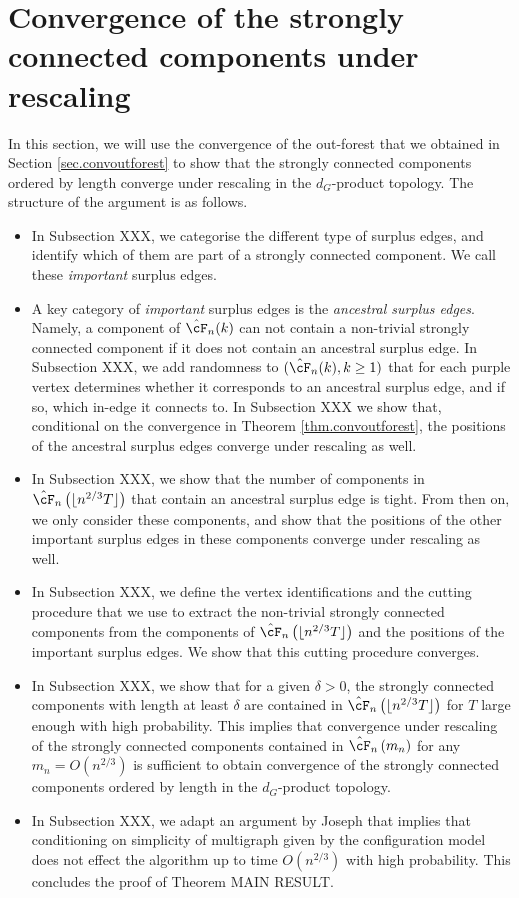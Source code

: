 \section{Convergence of the strongly connected components under rescaling}\label{sec.convSCCs}
In this section, we will use the convergence of the out-forest that we obtained in Section \ref{sec.convoutforest} to show that the strongly connected components ordered by length converge under rescaling in the $d_G$-product topology. The structure of the argument is as follows. 
\begin{itemize}
    \item In Subsection XXX, we categorise the different type of surplus edges, and identify which of them are part of a strongly connected component. We call these \emph{important} surplus edges.
    \item A key category of \emph{important} surplus edges is the \emph{ancestral surplus edges}. Namely, a component of $\hat{\cF}_n(k)$ can not contain a non-trivial strongly connected component if it does not contain an ancestral surplus edge. In Subsection XXX, we add randomness to $(\hat{\cF}_n(k),k\geq 1)$ that for each purple vertex determines whether it corresponds to an ancestral surplus edge, and if so, which in-edge it connects to. In Subsection XXX we show that, conditional on the convergence in Theorem \ref{thm.convoutforest}, the positions of the ancestral surplus edges converge under rescaling as well. 
    \item In Subsection XXX, we show that the number of components in $\hat{\cF}_n\left(\lfloor n^{2/3}T\rfloor \right)$ that contain an ancestral surplus edge is tight. From then on, we only consider these components, and show that the positions of the other important surplus edges in these components converge under rescaling as well. 
    \item In Subsection XXX, we define the vertex identifications and the cutting procedure that we use to extract the non-trivial strongly connected components from the components of $\hat{\cF}_n\left(\lfloor n^{2/3}T\rfloor \right)$ and the positions of the important surplus edges. We show that this cutting procedure converges.
    \item In Subsection XXX, we show that for a given $\delta>0$, the strongly connected components with length at least $\delta$ are contained in $\hat{\cF}_n\left(\lfloor n^{2/3}T\rfloor \right)$ for $T$ large enough with high probability. This implies that convergence under rescaling of the strongly connected components contained in $\hat{\cF}_n\left(m_n \right)$ for any $m_n=O(n^{2/3})$ is sufficient to obtain convergence of the strongly connected components ordered by length in the $d_G$-product topology. 
    \item In Subsection XXX, we adapt an argument by Joseph \cite{josephComponentSizesCritical2014} that implies that conditioning on simplicity of multigraph given by the configuration model does not effect the algorithm up to time $O(n^{2/3})$ with high probability. This concludes the proof of Theorem MAIN RESULT. 
\end{itemize}

